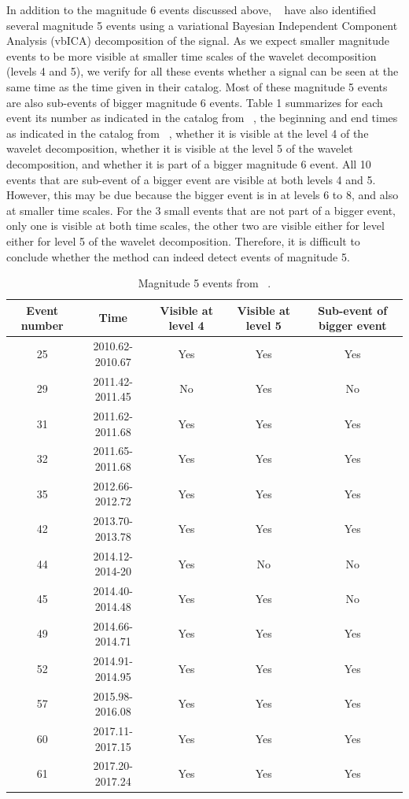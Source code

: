 \documentclass[draft]{agujournal2018}
\begin{document}
In addition to the magnitude 6 events discussed above,  ~\citet{MIC_2019} have also identified several magnitude 5 events using a variational Bayesian Independent Component Analysis (vbICA) decomposition of the signal. As we expect smaller magnitude events to be more visible at smaller time scales of the wavelet decomposition (levels 4 and 5), we verify for all these events whether a signal can be seen at the same time as the time given in their catalog. Most of these magnitude 5 events are also sub-events of bigger magnitude 6 events. Table 1 summarizes for each event its number as indicated in the catalog from ~\citet{MIC_2019}, the beginning and end times as indicated in the catalog from ~\citet{MIC_2019}, whether it is visible at the level 4 of the wavelet decomposition, whether it is visible at the level 5 of the wavelet decomposition, and whether it is part of a bigger magnitude 6 event. All 10 events that are sub-event of a bigger event are visible at both levels 4 and 5. However, this may be due because the bigger event is in at levels 6 to 8, and also at smaller time scales. For the 3 small events that are not part of a bigger event, only one is visible at both time scales, the other two are visible either for level either for level 5 of the wavelet decomposition. Therefore, it is difficult to conclude whether the method can indeed detect events of magnitude 5.

 \begin{table}
 \caption{Magnitude 5 events from ~\citet{MIC_2019}.}
 \centering
 \begin{tabular}{c c c c c}
 \hline
 Event number & Time & Visible at level 4 & Visible at level 5 & Sub-event of bigger event \\
 \hline
 25 & 2010.62-2010.67 & Yes & Yes & Yes \\
 29 & 2011.42-2011.45 & No & Yes & No \\
 31 & 2011.62-2011.68 & Yes & Yes & Yes \\
 32 & 2011.65-2011.68 & Yes & Yes & Yes \\
 35 & 2012.66-2012.72 & Yes & Yes & Yes \\
 42 & 2013.70-2013.78 & Yes & Yes & Yes \\
 44 & 2014.12-2014-20 & Yes & No & No \\
 45 & 2014.40-2014.48 & Yes & Yes & No \\
 49 & 2014.66-2014.71 & Yes & Yes & Yes \\
 52 & 2014.91-2014.95 & Yes & Yes & Yes \\
 57 & 2015.98-2016.08 & Yes & Yes & Yes \\
 60 & 2017.11-2017.15 & Yes & Yes & Yes \\
 61 & 2017.20-2017.24 & Yes & Yes & Yes \\
 \hline
 \end{tabular}
 \end{table}
\end{document}
